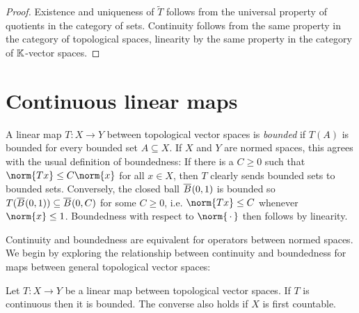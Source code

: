 \documentclass[article, a4paper, 11pt, oneside]{memoir}
\numberwithin{equation}{chapter}
\begin{document}
\begin{proof}
    Existence and uniqueness of $\tilde{T}$ follows from the universal property of quotients in the category of sets. Continuity follows from the same property in the category of topological spaces, linearity by the same property in the category of $\mathbb{K}$-vector spaces.
\end{proof}


\section{Continuous linear maps}

A linear map $T \colon X \to Y$ between topological vector spaces is \emph{bounded} if $T(A)$ is bounded for every bounded set $A \subseteq X$. If $X$ and $Y$ are normed spaces, this agrees with the usual definition of boundedness: If there is a $C \geq 0$ such that $\norm{Tx} \leq C\norm{x}$ for all $x \in X$, then $T$ clearly sends bounded sets to bounded sets. Conversely, the closed ball $\overline{B}_{}(0,1)$ is bounded so $T(\overline{B}_{}(0,1)) \subseteq \overline{B}_{}(0,C)$ for some $C \geq 0$, i.e. $\norm{Tx} \leq C$ whenever $\norm{x} \leq 1$. Boundedness with respect to $\norm{\,\cdot\,}$ then follows by linearity.

Continuity and boundedness are equivalent for operators between normed spaces. We begin by exploring the relationship between continuity and boundedness for maps between general topological vector spaces:

\begin{proposition}
    \label{thm:continuity-boundedness-equivalent}
    Let $T \colon X \to Y$ be a linear map between topological vector spaces. If $T$ is continuous then it is bounded. The converse also holds if $X$ is first countable.
\end{proposition}
\end{document}
